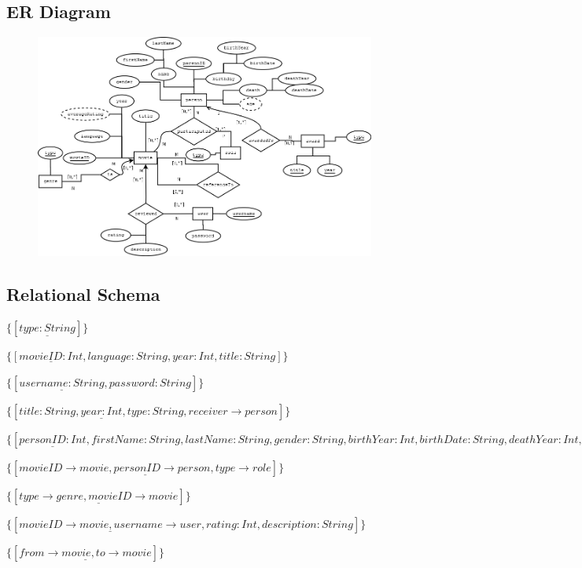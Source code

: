 \documentclass[10pt,a4paper,final]{report}
\begin{document}
\subsection*{ER Diagram}
\begin{figure}[h]
     \includegraphics[scale=0.4]{ERdiagram.png}
\end{figure}
\subsection*{Relational Schema}
\begin{description}[style=nextline]
     \item[genre]
     $\{[\underline{type:String}]\}$
     \item[movie]
     $\{[\underline{movieID:Int},language:String,year:Int,title:String]\}$
     \item[user]
     $\{[\underline{username:String},password:String]\}$
     \item[award]
     $\{[\underline{title:String, year:Int, type:String}, receiver \rightarrow person]\}$
     \item[person]
     $\{[\underline{personID:Int},firstName:String, lastName:String, gender:String, birthYear:Int, birthDate:String, deathYear:Int, deathDate:String]\}$
     \item[participated]
     $\{[\underline{movieID\rightarrow movie, personID \rightarrow person, type \rightarrow role}]\}$
     \item[is]
     $\{[\underline{type \rightarrow genre, movieID \rightarrow movie}]\}$
     \item[reviewed]
     $\{[\underline{movieID \rightarrow movie, username \rightarrow user}, rating:Int, description:String]\}$
     \item[referenceTo]
     $\{[\underline{from \rightarrow movie, to \rightarrow movie}]\}$
\end{description}
\end{document}
